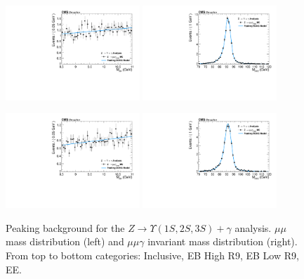 \begin{figure}[!htbp]
\begin{center}
\includegraphics[width=0.45\textwidth]{figures_and_tables/fitPlotFiles2D/ZToUpsilonPhotonSignalAndBackgroundFit/mMuMNU_ZToUpsilon1SPhotonSignalAndBackgroundFit_PeakingBackground_Cat2}\hspace*{1.cm}
\includegraphics[width=0.45\textwidth]{figures_and_tables/fitPlotFiles2D/ZToUpsilonPhotonSignalAndBackgroundFit/mHZ_ZToUpsilon1SPhotonSignalAndBackgroundFit_PeakingBackground_Cat2}\hspace*{1.cm}

\includegraphics[width=0.45\textwidth]{figures_and_tables/fitPlotFiles2D/ZToUpsilonPhotonSignalAndBackgroundFit/mMuMNU_ZToUpsilon1SPhotonSignalAndBackgroundFit_PeakingBackground_Cat3}\hspace*{1.cm}
\includegraphics[width=0.45\textwidth]{figures_and_tables/fitPlotFiles2D/ZToUpsilonPhotonSignalAndBackgroundFit/mHZ_ZToUpsilon1SPhotonSignalAndBackgroundFit_PeakingBackground_Cat3}\hspace*{1.cm}


\end{center}\vspace*{-.5cm}
\caption{Peaking background for the $Z \rightarrow \Upsilon(1S,2S,3S) +\gamma$ analysis. $\mu\mu$ mass distribution (left) and $\mu\mu\gamma$ invariant mass distribution (right). From top to bottom categories: Inclusive, EB High R9, EB Low R9, EE.}
\label{fig:ZToUpsilon_PeakingBackground}
\end{figure}

